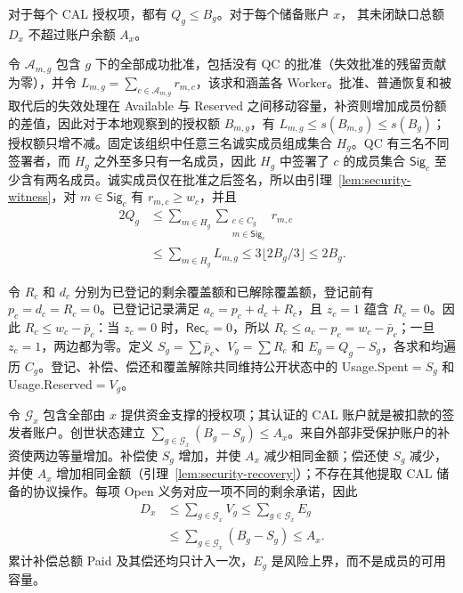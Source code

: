 \begin{theorem}[潜在责任具有资金覆盖]
\label{thm:security-coverage}
对于每个 CAL 授权项，都有 $Q_g\le B_g$。对于每个储备账户 $x$，
其未闭缺口总额 $D_x$ 不超过账户余额 $A_x$。
\end{theorem}
\begin{IEEEproof}
令 $\mathcal A_{m,g}$ 包含 $g$ 下的全部成功批准，包括没有 QC 的批准（失效批准的残留贡献为零），并令 $L_{m,g}=\sum_{c\in\mathcal A_{m,g}}r_{m,c}$，该求和涵盖各 Worker。批准、普通恢复和被取代后的失效处理在 Available 与 Reserved 之间移动容量，补资则增加成员份额的差值，因此对于本地观察到的授权额 $B_{m,g}$，有 $L_{m,g}\le s(B_{m,g})\le s(B_g)$；授权额只增不减。固定该组织中任意三名诚实成员组成集合 $H_g$。QC 有三名不同签署者，而 $H_g$ 之外至多只有一名成员，因此 $H_g$ 中签署了 $c$ 的成员集合 $\mathsf{Sig}_c$ 至少含有两名成员。诚实成员仅在批准之后签名，所以由引理~\ref{lem:security-witness}，对 $m\in\mathsf{Sig}_c$ 有 $r_{m,c}\ge w_c$，并且
\begin{equation}
\begin{aligned}
  2Q_g
  &\le\sum_{m\in H_g}\sum_{\substack{c\in C_g\\m\in\mathsf{Sig}_c}}r_{m,c}\\
  &\le\sum_{m\in H_g}L_{m,g}
  \le3\lfloor2B_g/3\rfloor\le2B_g.
\end{aligned}
\label{eq:security-counting}
\end{equation}

令 $R_c$ 和 $d_c$ 分别为已登记的剩余覆盖额和已解除覆盖额，登记前有 $p_c=d_c=R_c=0$。已登记记录满足 $a_c=p_c+d_c+R_c$，且 $z_c=1$ 蕴含 $R_c=0$。因此 $R_c\le w_c-\bar p_c$：当 $z_c=0$ 时，$\mathsf{Rec}_c=0$，所以 $R_c\le a_c-p_c=w_c-\bar p_c$；一旦 $z_c=1$，两边都为零。定义 $S_g=\sum\bar p_c$、$V_g=\sum R_c$ 和 $E_g=Q_g-S_g$，各求和均遍历 $C_g$。登记、补偿、偿还和覆盖解除共同维持公开状态中的 Usage.Spent$=S_g$ 和 Usage.Reserved$=V_g$。

令 $\mathcal G_x$ 包含全部由 $x$ 提供资金支撑的授权项；其认证的 CAL 账户就是被扣款的签发者账户。创世状态建立 $\sum_{g\in\mathcal G_x}(B_g-S_g)\le A_x$。来自外部非受保护账户的补资使两边等量增加。补偿使 $S_g$ 增加，并使 $A_x$ 减少相同金额；偿还使 $S_g$ 减少，并使 $A_x$ 增加相同金额（引理~\ref{lem:security-recovery}）；不存在其他提取 CAL 储备的协议操作。每项 Open 义务对应一项不同的剩余承诺，因此
\begin{equation}
\begin{aligned}
D_x&\le\sum_{g\in\mathcal G_x}V_g
    \le\sum_{g\in\mathcal G_x}E_g\\
   &\le\sum_{g\in\mathcal G_x}(B_g-S_g)\le A_x.
\end{aligned}
\label{eq:security-backing}
\end{equation}
累计补偿总额 Paid 及其偿还均只计入一次，$E_g$ 是风险上界，而不是成员的可用容量。
\end{IEEEproof}

